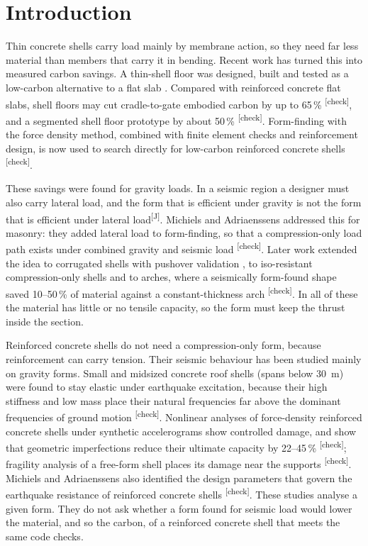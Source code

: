 \documentclass[preprint,12pt]{elsarticle}
\newcommand{\chk}{\textsuperscript{\textcolor{markcol}{\sffamily\scriptsize[check]}}}
\newcommand{\jud}{\textsuperscript{\textcolor{markcol}{\sffamily\scriptsize[J]}}}
\newcommand{\chk}{}
\newcommand{\jud}{}
\begin{document}
\section{Introduction}\label{sec:intro}

Thin concrete shells carry load mainly by membrane action, so they need far less material than members that carry it in bending. Recent work has turned this into measured carbon savings. A thin-shell floor was designed, built and tested as a low-carbon alternative to a flat slab \cite{Hawkins2019}. Compared with reinforced concrete flat slabs, shell floors may cut cradle-to-gate embodied carbon by up to 65\,\% \cite{Jayasinghe2022}\chk, and a segmented shell floor prototype by about 50\,\% \cite{Oval2023}\chk. Form-finding with the force density method, combined with finite element checks and reinforcement design, is now used to search directly for low-carbon reinforced concrete shells \cite{Leonardi2026}\chk.

These savings were found for gravity loads. In a seismic region a designer must also carry lateral load, and the form that is efficient under gravity is not the form that is efficient under lateral load\jud. Michiels and Adriaenssens addressed this for masonry: they added lateral load to form-finding, so that a compression-only load path exists under combined gravity and seismic load \cite{Michiels2017IASS,Michiels2018CS}\chk. Later work extended the idea to corrugated shells with pushover validation \cite{Michiels2019}, to iso-resistant compression-only shells \cite{Olivieri2025} and to arches, where a seismically form-found shape saved 10--50\,\% of material against a constant-thickness arch \cite{MalagaChuquitaype2022}\chk. In all of these the material has little or no tensile capacity, so the form must keep the thrust inside the section.

Reinforced concrete shells do not need a compression-only form, because reinforcement can carry tension. Their seismic behaviour has been studied mainly on gravity forms. Small and midsized concrete roof shells (spans below 30~m) were found to stay elastic under earthquake excitation, because their high stiffness and low mass place their natural frequencies far above the dominant frequencies of ground motion \cite{Hammood2023}\chk. Nonlinear analyses of force-density reinforced concrete shells under synthetic accelerograms show controlled damage, and show that geometric imperfections reduce their ultimate capacity by 22--45\,\% \cite{PerezVega2026}\chk; fragility analysis of a free-form shell places its damage near the supports \cite{CaycedoGarcia2025}\chk. Michiels and Adriaenssens also identified the design parameters that govern the earthquake resistance of reinforced concrete shells \cite{Michiels2017ES}\chk. These studies analyse a given form. They do not ask whether a form found for seismic load would lower the material, and so the carbon, of a reinforced concrete shell that meets the same code checks.
\end{document}
